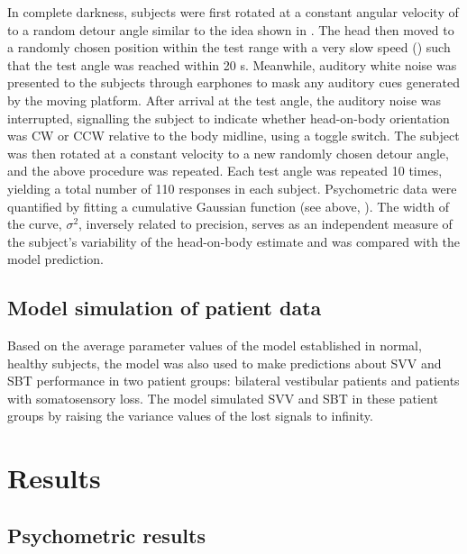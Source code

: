 In complete darkness, subjects were first rotated at a constant angular velocity of  to a random detour angle similar to the idea shown in . The head then moved to a randomly chosen position within the test range with a very slow speed () such that the test angle was reached within 20 \si{\second}. Meanwhile, auditory white noise was presented to the subjects through earphones to mask any auditory cues generated by the moving platform. After arrival at the test angle, the auditory noise was interrupted, signalling the subject to indicate whether head-on-body orientation was CW or CCW relative to the body midline, using a toggle switch. The subject was then rotated at a constant velocity to a new randomly chosen detour angle, and the above procedure was repeated. Each test angle was repeated 10 times, yielding a total number of 110 responses in each subject. Psychometric data were quantified by fitting a cumulative Gaussian function (see above, ). The width of the curve, $\sigma^2$, inversely related to precision, serves as an independent measure of the subject's variability of the head-on-body estimate and was compared with the model prediction. 

\subsection{Model simulation of patient data}

Based on the average parameter values of the model established in normal, healthy subjects, the model was also used to make predictions about SVV and SBT performance in two patient groups: bilateral vestibular patients and patients with somatosensory loss. The model simulated SVV and SBT in these patient groups by raising the variance values of the lost signals to infinity. 



\section{Results}

\subsection{Psychometric results}
 
